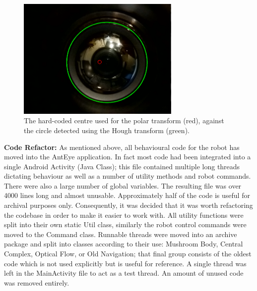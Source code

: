 \documentclass[a4paper,11pt,twoside,openright]{article}
\begin{document}
\begin{figure}
  \centering
  \includegraphics[width=0.7\textwidth]{Centre}
  \caption{\label{fig:centre} The hard-coded centre used for the polar transform
    (red), against the circle detected using the Hough transform (green).
   }
\end{figure}

\textbf{Code Refactor:} As mentioned above, all behavioural code for
the robot has moved into the AntEye application. In fact most code had
been integrated into a single Android Activity (Java Class); this file
contained multiple long threads dictating behaviour as well as a
number of utility methods and robot commands. There were also a large
number of global variables. The resulting file was over 4000 lines
long and almost unusable. Approximately half of the code is useful for
archival purposes only. Consequently, it was decided that it was worth
refactoring the codebase in order to make it easier to work with. All
utility functions were split into their own static Util class,
similarly the robot control commands were moved to the Command
class. Runnable threads were moved into an archive package and split
into classes according to their use: Mushroom Body, Central Complex,
Optical Flow, or Old Navigation; that final group consists of the
oldest code which is not used explicitly but is useful for
reference. A single thread was left in the MainActivity file to act
as a test thread. An amount of unused code was removed entirely.
\newline
\par
\end{document}
